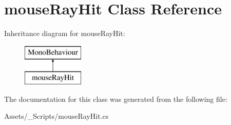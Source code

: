 \hypertarget{classmouse_ray_hit}{}\section{mouse\+Ray\+Hit Class Reference}
\label{classmouse_ray_hit}
Inheritance diagram for mouse\+Ray\+Hit\+:\begin{figure}[H]
\begin{center}
\leavevmode
\includegraphics[height=2.000000cm]{classmouse_ray_hit}
\end{center}
\end{figure}


The documentation for this class was generated from the following file\+:\begin{DoxyCompactItemize}
\item 
Assets/\+\_\+\+Scripts/mouse\+Ray\+Hit.\+cs\end{DoxyCompactItemize}
